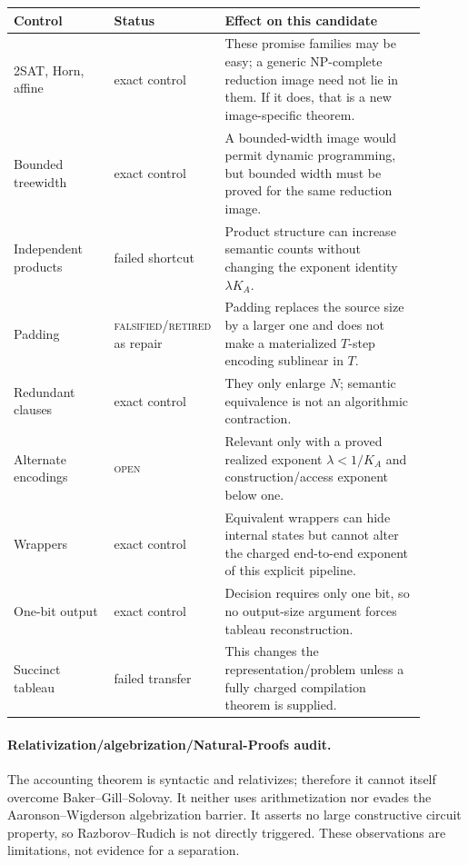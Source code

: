\documentclass[11pt]{article}
\newcommand{\OPEN}{\textsc{open}}
\newcommand{\RET}{\textsc{falsified/retired}}
\begin{document}
\begin{longtable}{p{0.24\linewidth}p{0.18\linewidth}p{0.48\linewidth}}
\toprule
Control & Status & Effect on this candidate\\
\midrule
2SAT, Horn, affine & exact control & These promise families may be easy; a generic
NP-complete reduction image need not lie in them.  If it does, that is a new
image-specific theorem.\\
Bounded treewidth & exact control & A bounded-width image would permit dynamic
programming, but bounded width must be proved for the same reduction image.\\
Independent products & failed shortcut & Product structure can increase semantic
counts without changing the exponent identity $\lambda K_A$.\\
Padding & \RET{} as repair & Padding replaces the source size by a larger one and
does not make a materialized $T$-step encoding sublinear in $T$.\\
Redundant clauses & exact control & They only enlarge $N$; semantic equivalence is
not an algorithmic contraction.\\
Alternate encodings & \OPEN{} & Relevant only with a proved realized exponent
$\lambda<1/K_A$ and construction/access exponent below one.\\
Wrappers & exact control & Equivalent wrappers can hide internal states but cannot
alter the charged end-to-end exponent of this explicit pipeline.\\
One-bit output & exact control & Decision requires only one bit, so no output-size
argument forces tableau reconstruction.\\
Succinct tableau & failed transfer & This changes the representation/problem unless
a fully charged compilation theorem is supplied.\\
\bottomrule
\end{longtable}

\paragraph{Relativization/algebrization/Natural-Proofs audit.}
The accounting theorem is syntactic and relativizes; therefore it cannot itself
overcome Baker--Gill--Solovay.  It neither uses arithmetization nor evades the
Aaronson--Wigderson algebrization barrier.  It asserts no large constructive circuit
property, so Razborov--Rudich is not directly triggered.  These observations are
limitations, not evidence for a separation.
\end{document}
